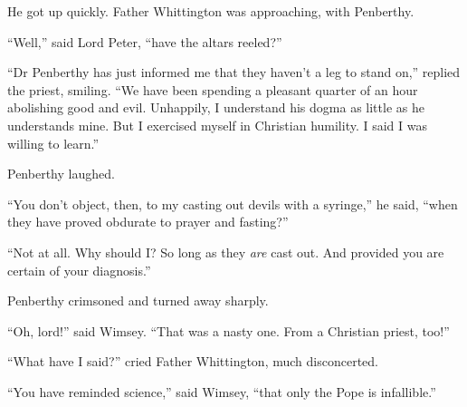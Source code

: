 He got up quickly. Father Whittington was approaching, with Penberthy.

\enquote{Well,} said Lord Peter, \enquote{have the altars reeled?}

\enquote{Dr Penberthy has just informed me that they haven't a leg to stand on,} replied the priest, smiling. \enquote{We have been spending a pleasant quarter of an hour abolishing good and evil. Unhappily, I understand his dogma as little as he understands mine. But I exercised myself in Christian humility. I said I was willing to learn.}

Penberthy laughed.

\enquote{You don't object, then, to my casting out devils with a syringe,} he said, \enquote{when they have proved obdurate to prayer and fasting?}

\enquote{Not at all. Why should I? So long as they \textit{are} cast out. And provided you are certain of your diagnosis.}

Penberthy crimsoned and turned away sharply.

\enquote{Oh, lord!} said Wimsey. \enquote{That was a nasty one. From a Christian priest, too!}

\enquote{What have I said?} cried Father Whittington, much disconcerted.

\enquote{You have reminded science,} said Wimsey, \enquote{that only the Pope is infallible.}